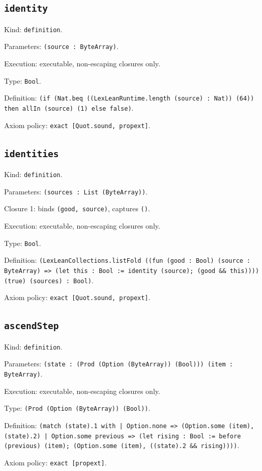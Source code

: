 \documentclass[11pt]{article}
\begin{document}
\subsection*{\texttt{identity}}
\noindent Kind: \texttt{definition}.\par
\noindent Parameters: \texttt{(source : ByteArray)}.\par
\noindent Execution: executable, non-escaping closures only.\par
\noindent Type: \texttt{Bool}.\par
\noindent Definition: \texttt{(if (Nat.beq ((LexLeanRuntime.length (source) : Nat)) (64)) then allIn (source) (1) else false)}.\par
\noindent Axiom policy: \texttt{exact [Quot.sound, propext]}.\par
\subsection*{\texttt{identities}}
\noindent Kind: \texttt{definition}.\par
\noindent Parameters: \texttt{(sources : List (ByteArray))}.\par
\noindent Closure 1: binds \texttt{(good, source)}, captures \texttt{()}.\par
\noindent Execution: executable, non-escaping closures only.\par
\noindent Type: \texttt{Bool}.\par
\noindent Definition: \texttt{(LexLeanCollections.listFold ((fun (good : Bool) (source : ByteArray) => (let this : Bool := identity (source); (good \&\& this)))) (true) (sources) : Bool)}.\par
\noindent Axiom policy: \texttt{exact [Quot.sound, propext]}.\par
\subsection*{\texttt{ascendStep}}
\noindent Kind: \texttt{definition}.\par
\noindent Parameters: \texttt{(state : (Prod (Option (ByteArray)) (Bool))) (item : ByteArray)}.\par
\noindent Execution: executable, non-escaping closures only.\par
\noindent Type: \texttt{(Prod (Option (ByteArray)) (Bool))}.\par
\noindent Definition: \texttt{(match (state).1 with | Option.none => (Option.some (item), (state).2) | Option.some previous => (let rising : Bool := before (previous) (item); (Option.some (item), ((state).2 \&\& rising))))}.\par
\noindent Axiom policy: \texttt{exact [propext]}.\par
\end{document}
